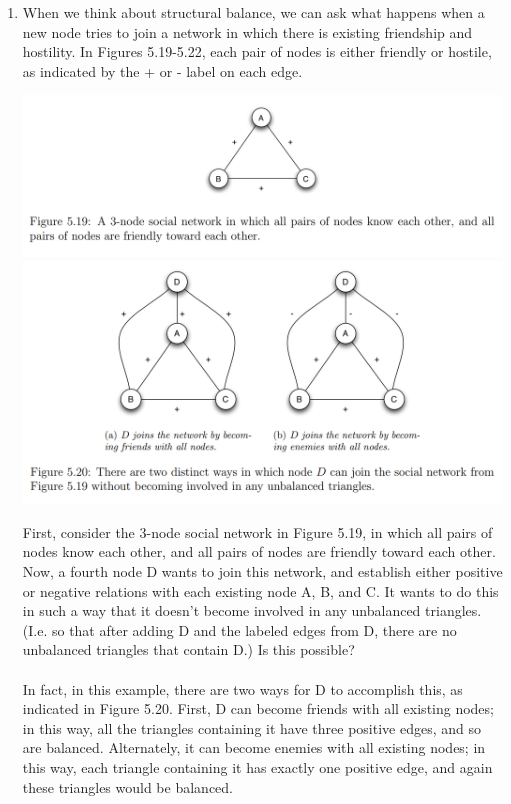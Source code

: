 \documentclass[11pt]{article}
\begin{document}
\begin{enumerate}
\item  When we think about structural balance, we can ask what happens when a new node tries to join a network in which there is existing friendship and hostility. In Figures 5.19-5.22, each pair of nodes is either friendly or hostile, as indicated by the + or - label on each edge.\\
\begin{center}
	\includegraphics[scale=1]{Figure_5_19}\\
	\includegraphics[scale=1]{Figure_5_19-20}\\
\end{center}
First, consider the 3-node social network in Figure 5.19, in which all pairs of nodes know each other, and all pairs of nodes are friendly toward each other. Now, a fourth node D wants to join this network, and establish either positive or negative relations with each existing node A, B, and C. It wants to do this in such a way that it doesn’t become involved in any unbalanced triangles. (I.e. so that after adding D and the labeled edges from D, there are no unbalanced triangles that contain D.) Is this possible?\\\\
In fact, in this example, there are two ways for D to accomplish this, as indicated in Figure 5.20. First, D can become friends with all existing nodes; in this way, all the triangles containing it have three positive edges, and so are balanced. Alternately, it can become enemies with all existing nodes; in this way, each triangle containing it has exactly one positive edge, and again these triangles would be balanced.\\\\

\end{enumerate}
\end{document}
